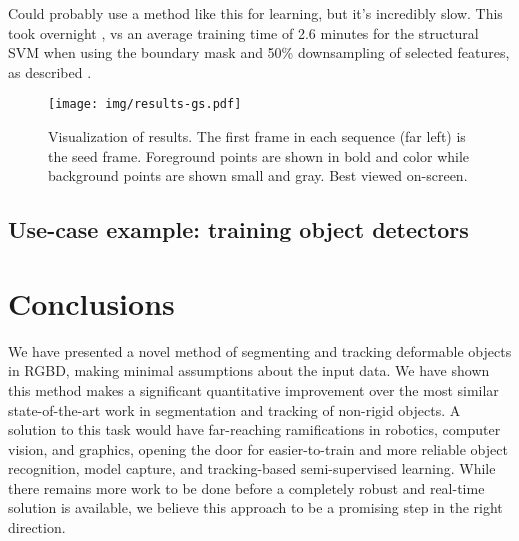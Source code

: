 \documentclass[graybox]{svmult}
\begin{document}
Could probably use a method like this for learning, but it's incredibly slow.  This took overnight , vs an average training time of 2.6 minutes for the structural SVM when using the boundary mask and 50\% downsampling of selected features, as described .  


\begin{figure*}
  \centering
  \vspace{1cm}
  \texttt{[image: img/results-gs.pdf]}
  \caption{Visualization of results.  The first frame in each sequence (far left) is the seed frame.  Foreground points are shown in bold and color while background points are shown small and gray. Best viewed on-screen.}
  \label{fig:results}
  \vspace{50pt}
\end{figure*}

\subsection{Use-case example: training object detectors}

\section{Conclusions}

We have presented a novel method of segmenting and tracking deformable objects in RGBD, making minimal assumptions about the input data.  We have shown this method makes a significant quantitative improvement over the most similar state-of-the-art work in segmentation and tracking of non-rigid objects.  A solution to this task would have far-reaching ramifications in robotics, computer vision, and graphics, opening the door for easier-to-train and more reliable object recognition, model capture, and tracking-based semi-supervised learning.  While there remains more work to be done before a completely robust and real-time solution is available, we believe this approach to be a promising step in the right direction.

\pagebreak

\small{


}
\end{document}
